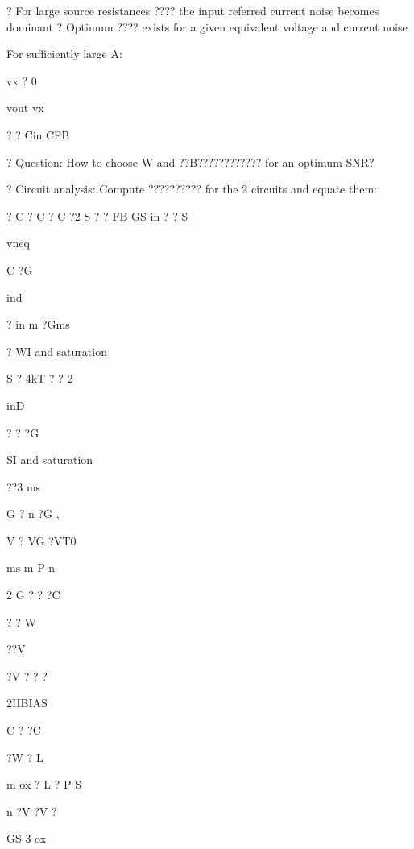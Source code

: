\documentclass[2pt,landscape]{article}
\begin{document}
\begin{multicols*}{5}
?	For large source resistances ???? the input referred current noise 
becomes dominant
?	Optimum ???? exists for a given equivalent voltage and current noise









For sufficiently large A:

vx ? 0


vout
vx


? ? Cin
CFB









?	Question:
How to choose W and ??B????????????  for an optimum SNR?






?	Circuit analysis:
Compute ?????????? for the 2 circuits and equate them:




? C	? C	? C	?2
S	? ?   FB	GS	in ? ? S


vneq


C ?G


ind


?	in	m
?Gms



?
WI and saturation


S	? 4kT ? ? 2


inD


?
?  ?G



SI and saturation


??3	ms


G	? n ?G ,


V ? VG ?VT0



ms	m	P	n




2	G	? ? ?C


? ? W


??V


?V ? ?	?


2IIBIAS




C	?	?C




?W ? L


m	ox   
? L ?	P	S


n ?V ?V ?


GS	3	ox



\end{multicols*}
\end{document}
